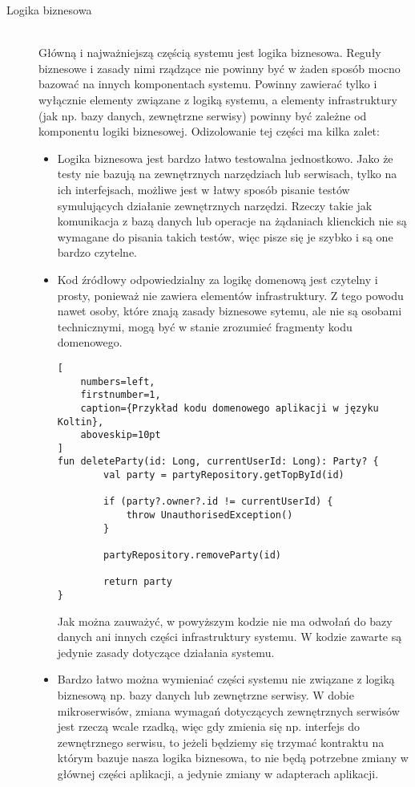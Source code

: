\begin{description}
  \item[Logika biznesowa] \hfill \\ Główną i najważniejszą częścią systemu jest logika biznesowa. Reguły biznesowe i zasady nimi rządzące nie powinny być w żaden sposób mocno bazować na innych komponentach systemu. Powinny zawierać tylko i wyłącznie elementy związane z logiką systemu, a elementy infrastruktury (jak np. bazy danych, zewnętrzne serwisy) powinny być zależne od komponentu logiki biznesowej. Odizolowanie tej części ma kilka zalet:
\begin{itemize}
  \item Logika biznesowa jest bardzo łatwo testowalna jednostkowo. Jako że testy nie bazują na zewnętrznych narzędziach lub serwisach, tylko na ich interfejsach, możliwe jest w łatwy sposób pisanie testów symulujących działanie zewnętrznych narzędzi. Rzeczy takie jak komunikacja z bazą danych lub operacje na żądaniach klienckich nie są wymagane do pisania takich testów, więc pisze się je szybko i są one bardzo czytelne.
  \item Kod źródłowy odpowiedzialny za logikę domenową jest czytelny i prosty, ponieważ nie zawiera elementów infrastruktury. Z tego powodu nawet osoby, które znają zasady biznesowe sytemu, ale nie są osobami technicznymi, mogą być w stanie zrozumieć fragmenty kodu domenowego.
\begin{addmargin}[6mm]{0mm}
\begin{lstlisting}[
    numbers=left,
    firstnumber=1,
    caption={Przykład kodu domenowego aplikacji w języku Koltin},
    aboveskip=10pt
]
fun deleteParty(id: Long, currentUserId: Long): Party? {
        val party = partyRepository.getTopById(id)

        if (party?.owner?.id != currentUserId) {
            throw UnauthorisedException()
        }

        partyRepository.removeParty(id)

        return party
}
\end{lstlisting}
\end{addmargin}
  Jak można zauważyć, w powyższym kodzie nie ma odwołań do bazy danych ani innych części infrastruktury systemu. W kodzie zawarte są jedynie zasady dotyczące działania systemu.%
  \item Bardzo łatwo można wymieniać części systemu nie związane z logiką biznesową np. bazy danych lub zewnętrzne serwisy. W dobie mikroserwisów, zmiana wymagań dotyczących zewnętrznych serwisów jest rzeczą wcale rzadką, więc gdy zmienia się np. interfejs do zewnętrznego serwisu, to jeżeli będziemy się trzymać kontraktu na którym bazuje nasza logika biznesowa, to nie będą potrzebne zmiany w głównej części aplikacji, a jedynie zmiany w adapterach aplikacji.
\end{itemize}



\end{description}
